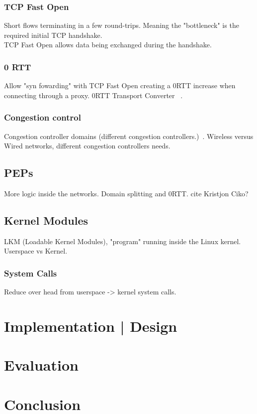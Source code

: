 \documentclass[a4paper,english, 11pt]{report}
\begin{document}
\subsection{TCP Fast Open}
Short flows terminating in a few round-trips. Meaning the "bottleneck" is the required initial TCP handshake.\\
TCP Fast Open allows data being exchanged during the handshake. 

\subsection{0 RTT}
Allow "syn fowarding" with TCP Fast Open creating a 0RTT increase when connecting through a proxy.
0RTT Transport Converter ~\cite{rfc8803}.

\subsection{Congestion control}
Congestion controller domains (different congestion controllers.)~\cite{rfc5783}.
Wireless versus Wired networks, different congestion controllers needs.

\section{PEPs}
More logic inside the networks. Domain splitting and 0RTT. {cite Kristjon Ciko?}

\section{Kernel Modules}
LKM (Loadable Kernel Modules), "program" running inside the Linux kernel.
Userspace vs Kernel.
\subsection{System Calls}
Reduce over head from userspace -> kernel system calls.

\chapter{Implementation | Design}
\chapter{Evaluation}
\chapter{Conclusion}

{}

\end{document}
